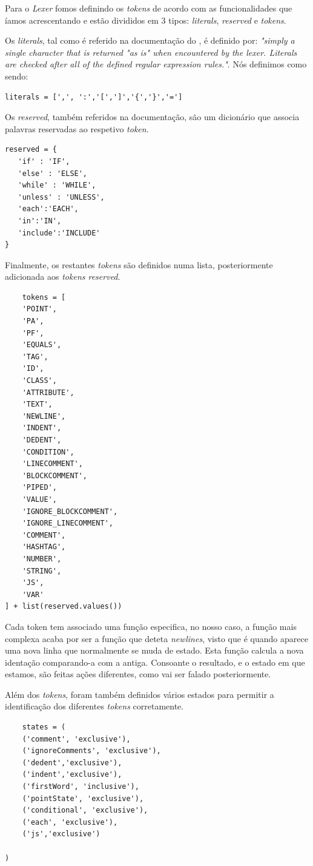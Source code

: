 \documentclass[11pt,a4paper]{report}%
\begin{document}
Para o \textit{Lexer} fomos definindo os \textit{tokens} de acordo com as funcionalidades que íamos acrescentando e estão divididos em 3 tipos: \textit{literals}, \textit{reserved} e \textit{tokens}.

Os \textit{literals}, tal como é referido na documentação do \cite{PLY}, é definido por: \textit{"simply a single character that is returned "as is" when encountered by the lexer. Literals are checked after all of the defined regular expression rules."}. Nós definimos como sendo:
\begin{verbatim}
literals = [',', ':','[',']','{','}','=']
\end{verbatim}

Os \textit{reserved}, também referidos na documentação, são um dicionário que associa palavras reservadas ao respetivo \textit{token}. 
\begin{verbatim}
reserved = {
   'if' : 'IF',
   'else' : 'ELSE',
   'while' : 'WHILE',
   'unless' : 'UNLESS',
   'each':'EACH',
   'in':'IN',
   'include':'INCLUDE'
}
\end{verbatim}

Finalmente, os restantes \textit{tokens} são definidos numa lista, posteriormente adicionada aos \textit{tokens reserved}.

\begin{verbatim}
    tokens = [
    'POINT',
    'PA',
    'PF',
    'EQUALS',
    'TAG',
    'ID',
    'CLASS',
    'ATTRIBUTE',
    'TEXT',
    'NEWLINE',
    'INDENT',
    'DEDENT',
    'CONDITION',
    'LINECOMMENT',
    'BLOCKCOMMENT',
    'PIPED',
    'VALUE',
    'IGNORE_BLOCKCOMMENT',
    'IGNORE_LINECOMMENT',
    'COMMENT',
    'HASHTAG',
    'NUMBER',
    'STRING',
    'JS',
    'VAR'
] + list(reserved.values())
\end{verbatim}

Cada token tem associado uma função especifica, no nosso caso, a função mais complexa acaba por ser a função que deteta \textit{newlines}, visto que é quando aparece uma nova linha que normalmente se muda de estado. Esta função calcula a nova identação comparando-a com a antiga. Consoante o resultado, e o estado em que estamos, são feitas ações diferentes, como vai ser falado posteriormente.

Além dos \textit{tokens}, foram também definidos vários estados para permitir a identificação dos diferentes \textit{tokens} corretamente. %

\begin{verbatim}
    states = (
    ('comment', 'exclusive'),
    ('ignoreComments', 'exclusive'),
    ('dedent','exclusive'),
    ('indent','exclusive'),
    ('firstWord', 'inclusive'),
    ('pointState', 'exclusive'),
    ('conditional', 'exclusive'),
    ('each', 'exclusive'),
    ('js','exclusive')
    
)



\end{verbatim}
\end{document}
